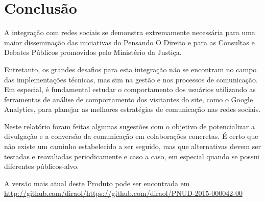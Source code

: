 \chapter{Conclusão}
A integração com redes sociais se demonstra extremamente necessária para uma maior disseminação das iniciativas do Pensando O Direito e para as Consultas e Debates Públicos promovidos pelo Ministério da Justiça.

Entretanto, os grandes desafios para esta integração não se encontram no campo das implementações técnicas, mas sim na gestão e nos processos de comunicação. Em especial, é fundamental estudar o comportamento dos usuários utilizando as ferramentas de análise de comportamento dos visitantes do site, como o Google Analytics, para planejar as melhores estratégias de comunicação nas redes sociais.

Neste relatório foram feitas algumas sugestões com o objetivo de potencializar a divulgação e a conversão da comunicação em colaborações concretas. É certo que não existe um caminho estabelecido a ser seguido, mas que alternativas devem ser testadas e reavaliadas periodicamente e caso a caso, em especial quando se possui diferentes públicos-alvo. 

A versão mais atual deste Produto pode ser encontrada em \url{http://github.com/diraol/https://github.com/diraol/PNUD-2015-000042-00}
